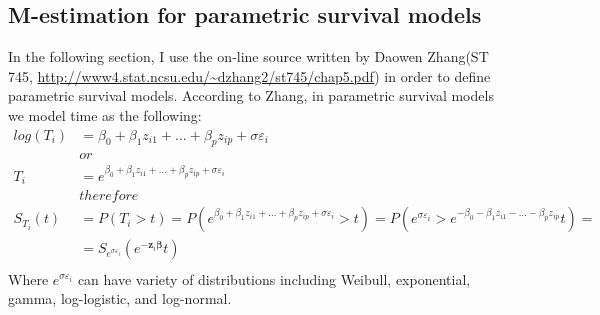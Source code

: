 \documentclass[]{article}
\let\epsilon\varepsilon
\begin{document}
\subsection{M-estimation for parametric survival models}
In the following section, I use the on-line source written by Daowen Zhang(ST 745,  \url{http://www4.stat.ncsu.edu/~dzhang2/st745/chap5.pdf}) in order to define parametric survival models. According to Zhang, in parametric survival models we model time as the following:
  $$
  \begin{aligned}
    log(T_i) &= \beta_0 + \beta_1z_{i1} + ... + \beta_p z_{ip} + \sigma \epsilon_{i}\\
    &or\\
    T_i &= e^{\beta_0 + \beta_1z_{i1} + ... + \beta_p z_{ip} + \sigma \epsilon_{i}}\\
    &therefore\\
    S_{T_i}(t) &= P(T_i>t) = P\left( e^{\beta_0 + \beta_1z_{i1} + ... + \beta_p z_{ip} + \sigma \epsilon_{i}} >t \right ) = P\left( e^{\sigma \epsilon_{i}} > e^{-\beta_0 - \beta_1z_{i1} - ... - \beta_p z_{ip}}t \right )=\\
    &=S_{e^{\sigma \epsilon_{i}}}(e^{-\pmb{z}_i \pmb{\beta}}t)\\
  \end{aligned}
  $$
Where $e^{\sigma \epsilon_{i}}$ can have variety of distributions including Weibull, exponential, gamma, log-logistic, and log-normal.
\end{document}
